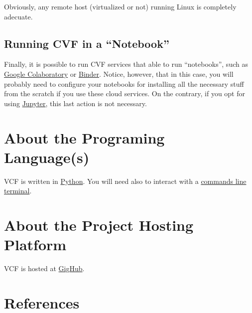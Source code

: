 Obviously, any remote host (virtualized or not) running Linux is
completely adecuate.

\subsection{Running CVF in a ``Notebook''}
Finally, it is possible to run CVF services that able to run
``notebooks'', such as
\href{https://colab.research.google.com/}{Google Colaboratory} or
\href{https://mybinder.org/}{Binder}. Notice, however, that in this
case, you will probably need to configure your notebooks for
installing all the necessary stuff from the scratch if you use these
cloud services. On the contrary, if you opt for using
\href{https://jupyter.org/}{Jupyter}, this last action is not
necessary.

\section{About the Programing Language(s)}

VCF is written in \href{https://mybinder.org/}{Python}. You will need
also to interact with
a \href{https://en.wikipedia.org/wiki/Command-line_interface}{commands
line terminal}.

\section{About the Project Hosting Platform}

VCF is hosted at \href{https://github.com/}{GigHub}.

\section{References}

\renewcommand{\addcontentsline}[3]{}%

